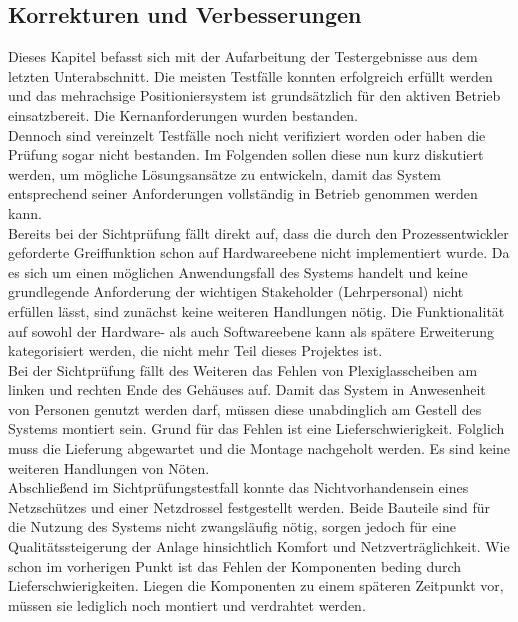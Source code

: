 \documentclass[../../../Bachelorarbeit.tex]{subfiles}
\begin{document}
\subsection{Korrekturen und Verbesserungen}
Dieses Kapitel befasst sich mit der Aufarbeitung der Testergebnisse aus dem letzten Unterabschnitt. Die meisten Testfälle konnten erfolgreich erfüllt werden und das mehrachsige Positioniersystem ist grundsätzlich für den aktiven Betrieb einsatzbereit. Die Kernanforderungen wurden bestanden.\\
Dennoch sind vereinzelt Testfälle noch nicht verifiziert worden oder haben die Prüfung sogar nicht bestanden. Im Folgenden sollen diese nun kurz diskutiert werden, um mögliche Lösungsansätze zu entwickeln, damit das System entsprechend seiner Anforderungen vollständig in Betrieb genommen werden kann.\\
Bereits bei der Sichtprüfung fällt direkt auf, dass die durch den Prozessentwickler geforderte Greiffunktion schon auf Hardwareebene nicht implementiert wurde. Da es sich um einen möglichen Anwendungsfall des Systems handelt und keine grundlegende Anforderung der wichtigen Stakeholder (Lehrpersonal) nicht erfüllen lässt, sind zunächst keine weiteren Handlungen nötig. Die Funktionalität auf sowohl der Hardware- als auch Softwareebene kann als spätere Erweiterung kategorisiert werden, die nicht mehr Teil dieses Projektes ist.\\
Bei der Sichtprüfung fällt des Weiteren das Fehlen von Plexiglasscheiben am linken und rechten Ende des Gehäuses auf. Damit das System in Anwesenheit von Personen genutzt werden darf, müssen diese unabdinglich am Gestell des Systems montiert sein. Grund für das Fehlen ist eine Lieferschwierigkeit. Folglich muss die Lieferung abgewartet und die Montage nachgeholt werden. Es sind keine weiteren Handlungen von Nöten.\\
Abschließend im Sichtprüfungstestfall konnte das Nichtvorhandensein eines Netzschützes und einer Netzdrossel festgestellt werden. Beide Bauteile sind für die Nutzung des Systems nicht zwangsläufig nötig, sorgen jedoch für eine Qualitätssteigerung der Anlage hinsichtlich Komfort und Netzverträglichkeit. Wie schon im vorherigen Punkt ist das Fehlen der Komponenten beding durch Lieferschwierigkeiten. Liegen die Komponenten zu einem späteren Zeitpunkt vor, müssen sie lediglich noch montiert und verdrahtet werden.\\
\end{document}
